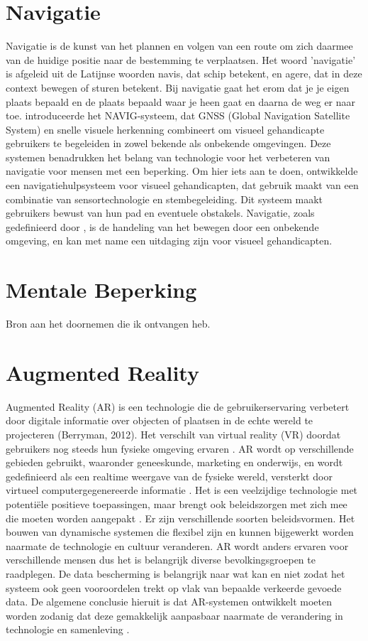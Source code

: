 \section{Navigatie}
\label{sec:navigatie}
Navigatie is de kunst van het plannen en volgen van een route om zich daarmee van de huidige positie naar de bestemming te verplaatsen. Het woord 'navigatie' is afgeleid uit de Latijnse woorden navis, dat schip betekent, en agere, dat in deze context bewegen of sturen betekent. Bij navigatie gaat het erom dat je je eigen plaats bepaald en de plaats bepaald waar je heen gaat en daarna de weg er naar toe. \textcite{Katz2010} introduceerde het NAVIG-systeem, dat GNSS (Global Navigation Satellite System) en snelle visuele herkenning combineert om visueel gehandicapte gebruikers te begeleiden in zowel bekende als onbekende omgevingen. Deze systemen benadrukken het belang van technologie voor het verbeteren van navigatie voor mensen met een beperking. Om hier iets aan te doen, ontwikkelde \textcite{Lakde2015} een navigatiehulpsysteem voor visueel gehandicapten, dat gebruik maakt van een combinatie van sensortechnologie en stembegeleiding. Dit systeem maakt gebruikers bewust van hun pad en eventuele obstakels. Navigatie, zoals gedefinieerd door \textcite{Gachet2010}, is de handeling van het bewegen door een onbekende omgeving, en kan met name een uitdaging zijn voor visueel gehandicapten.
\section{Mentale Beperking}
\label{sec:mentale beperking}
Bron aan het doornemen die ik ontvangen heb.
\section{Augmented Reality}
\label{sec:augmented reality}
Augmented Reality (AR) is een technologie die de gebruikerservaring verbetert door digitale informatie over objecten of plaatsen in de echte wereld te projecteren (Berryman, 2012). Het verschilt van virtual reality (VR) doordat gebruikers nog steeds hun fysieke omgeving ervaren \autocite{Calo2015}. AR wordt op verschillende gebieden gebruikt, waaronder geneeskunde, marketing en onderwijs, en wordt gedefinieerd als een realtime weergave van de fysieke wereld, versterkt door virtueel computergegenereerde informatie \autocite{Carmigniani2011}. Het is een veelzijdige technologie met potentiële positieve toepassingen, maar brengt ook beleidszorgen met zich mee die moeten worden aangepakt \autocite{Calo2015}. Er zijn verschillende soorten beleidsvormen. Het bouwen van dynamische systemen die flexibel zijn en kunnen bijgewerkt worden naarmate de technologie en cultuur veranderen. AR wordt anders ervaren voor verschillende mensen dus het is belangrijk diverse bevolkingsgroepen te raadplegen. De data bescherming is belangrijk naar wat kan en niet zodat het systeem ook geen vooroordelen trekt op vlak van bepaalde verkeerde gevoede data. De algemene conclusie hieruit is dat AR-systemen ontwikkelt moeten worden zodanig dat deze gemakkelijk aanpasbaar naarmate de verandering in technologie en samenleving \autocite{Calo2015}.
